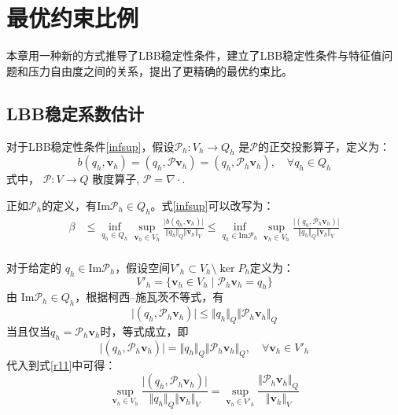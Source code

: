 \chapter{最优约束比例}
本章用一种新的方式推导了LBB稳定性条件，建立了LBB稳定性条件与特征值问题和压力自由度之间的关系，提出了更精确的最优约束比。
\section{LBB稳定系数估计}
对于LBB稳定性条件\eqref{infsup}，假设$\mathcal P_h:V_h \rightarrow Q_h$ 是$\mathcal P$的正交投影算子，定义为：
\begin{equation}\label{Ph}
    b(q_h,\boldsymbol v_h) = (q_h, \mathcal P \boldsymbol v_h) = (q_h, \mathcal P_h \boldsymbol v_h), \quad \forall q_h \in Q_h
\end{equation}
式中， $\mathcal P:V\rightarrow Q$ 散度算子, $\mathcal P = \nabla \cdot$. 

正如$\mathcal P_h$的定义，有$\mathrm{Im}\mathcal P_h \in Q_h$。式\eqref{infsup}可以改写为：
\begin{equation} \label{r11}
    \begin{split}
        \beta &\le \inf_{q_h \in Q_h} \sup_{\boldsymbol v_h \in V_h} \frac{\vert b(q_h,\boldsymbol v_h) \vert}{\Vert q_h \Vert_Q \Vert \boldsymbol v_h \Vert_V} 
        \le \inf_{q_h \in \mathrm{Im}\mathcal P_h} \sup_{\boldsymbol v_h \in V_h} \frac{\vert (q_h,\mathcal P_h \boldsymbol v_h) \vert}{\Vert q_h \Vert_Q \Vert \boldsymbol v_h \Vert_V} \\
    \end{split}
\end{equation}

对于给定的 $q_h\in \mathrm{Im}\mathcal P_h$，假设空间$V'_h \subset V_h\setminus \ker P_h$定义为：
\begin{equation}
    V'_h = \{ \boldsymbol v_h \in V_h \; \vert \; \mathcal P_h \boldsymbol v_h = q_h \}
\end{equation}
由 $\mathrm{Im}\mathcal P_h \in Q_h$，根据柯西--施瓦茨不等式，有
\begin{equation}
    \vert (q_h,\mathcal P_h \boldsymbol v_h) \vert \le \Vert q_h \Vert_Q \Vert \mathcal P_h \boldsymbol v_h \Vert_Q
\end{equation}
当且仅当$q_h=\mathcal P_h \boldsymbol v_h$时，等式成立，即
\begin{equation}
    \vert (q_h,\mathcal P_h \boldsymbol v_h) \vert = \Vert q_h \Vert_Q \Vert \mathcal P_h \boldsymbol v_h \Vert_Q, \quad \forall \boldsymbol v_h \in V'_h
\end{equation}
代入到式\eqref{r11}中可得：
\begin{equation}\label{r12}
    \sup_{\boldsymbol v_h\in V_h} \frac{\vert (q_h,\mathcal P_h \boldsymbol v_h) \vert}{\Vert q_h \Vert_Q \Vert \boldsymbol v_h \Vert_V} =
    \sup_{\boldsymbol v_h\in V'_h} \frac{\Vert \mathcal P_h \boldsymbol v_h \Vert_Q}{\Vert \boldsymbol v_h \Vert_V} 
\end{equation}

